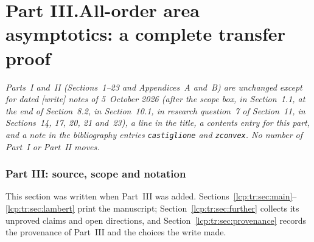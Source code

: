 \documentclass[11pt]{article}
\numberwithin{equation}{section}
\theoremstyle{definition}\newtheorem{definition}[theorem]{Definition}
\theoremstyle{remark}\newtheorem{remark}[theorem]{Remark}
\begin{document}
\clearpage
{}\part*{Part III.\quad All-order area asymptotics: a complete transfer proof}

\noindent\emph{Parts~I and~II (Sections~1--23 and Appendices~A and~B) are
unchanged except for dated \textsf{[write]} notes of 5~October 2026 (after
the scope box, in Section~1.1, at the end of Section~8.2, in Section~10.1,
in research question~7 of Section~11, in Sections~14, 17, 20, 21 and~23),
a line in the title, a contents entry for this part, and a note in the
bibliography entries \texttt{castiglione} and \texttt{zconvex}. No number of
Part~I or Part~II moves.}

\section{Part III: source, scope and notation}\label{lcp:tr:sec:intro}
This section was written when Part~III was added.
Sections~\ref{lcp:tr:sec:main}--\ref{lcp:tr:sec:lambert} print the
manuscript; Section~\ref{lcp:tr:sec:further} collects its unproved claims
and open directions, and Section~\ref{lcp:tr:sec:provenance} records the
provenance of Part~III and the choices the write made.
\end{document}
